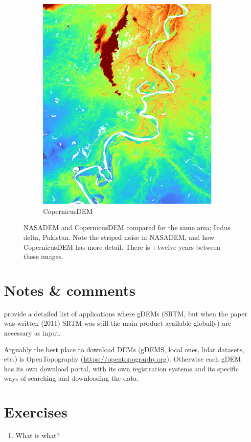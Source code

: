 \begin{figure}
\begin{subfigure}{0.45\linewidth}
    \includegraphics[width=\linewidth]{copernicusdem.png}
    \caption{CopernicusDEM}
    \label{fig:copernicusdem}
  \end{subfigure}
  \caption{NASADEM and CopernicusDEM compared for the same area; Indus delta, Pakistan.
    Note the striped noise in NASADEM, and how CopernicusDEM has more detail.
    There is $\pm$twelve years between these images.}%
  \label{fig:three graphs}
\end{figure}


%
\section{Notes \& comments}

\citet{Yang11} provide a detailed list of applications where gDEMs (SRTM, but when the paper was written (2011) SRTM was still the main product available globally) are necessary as input.

Arguably the best place to download DEMs (gDEMS, local ones, lidar datasets, etc.) is OpenTopography (\url{https://opentopography.org}).
Otherwise each gDEM has its own download portal, with its own registration systems and its specific ways of searching and downloading the data.




%
\section{Exercises}

\begin{enumerate}
  \item What is what?
\end{enumerate}
